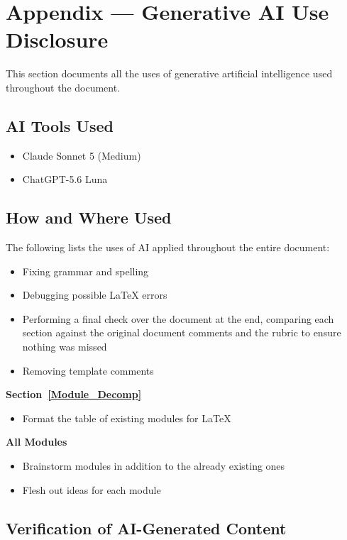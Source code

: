\documentclass[12pt, titlepage]{article}
\begin{document}
\newpage{}

\section{Appendix --- Generative AI Use Disclosure}
This section documents all the uses of generative artificial intelligence used throughout the document.

\subsection{AI Tools Used}

\begin{itemize}
  \item Claude Sonnet 5 (Medium)
  \item ChatGPT-5.6 Luna
\end{itemize}

\subsection{How and Where Used}

The following lists the uses of AI applied throughout the entire document:
\begin{itemize}
  \item Fixing grammar and spelling
  \item Debugging possible \LaTeX{} errors
  \item Performing a final check over the document at the end, comparing each section against the original document comments and the rubric to ensure nothing was missed
  \item Removing template comments
\end{itemize}

\noindent\textbf{Section~\ref{Module_Decomp}}
\begin{itemize}
    \item Format the table of existing modules for \LaTeX{}
\end{itemize}

\noindent\textbf{All Modules}
\begin{itemize}
    \item Brainstorm modules in addition to the already existing ones
    \item Flesh out ideas for each module
\end{itemize}

\subsection{Verification of AI-Generated Content}
\end{document}
